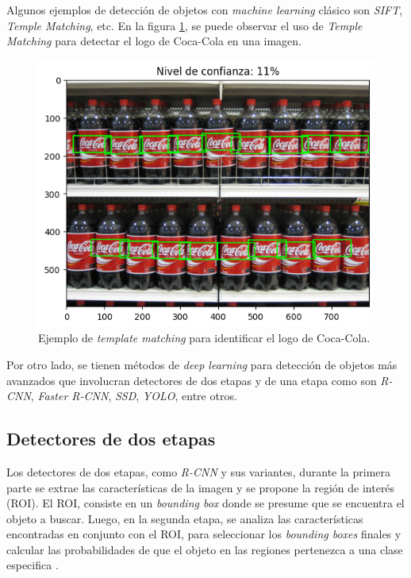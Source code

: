 Algunos ejemplos de detección de objetos con \textit{machine learning} clásico son \textit{SIFT}, \textit{Temple Matching}, etc. En la figura \ref{fig:tempMatch}, se puede observar el uso de \textit{Temple Matching} para detectar el logo de Coca-Cola en una imagen.

\begin{figure}[ht]
	\centering
	\includegraphics[scale=.45]{./Figures/template_match.png}
	\caption{Ejemplo de \textit{template matching} para identificar el logo de Coca-Cola.}
	\label{fig:tempMatch}
\end{figure}

Por otro lado, se tienen métodos de \textit{deep learning} para detección de objetos más avanzados que involucran detectores de dos etapas y de una etapa como son \textit{R-CNN}, \textit{Faster R-CNN}, \textit{SSD}, \textit{YOLO}, entre otros.

\subsection{Detectores de dos etapas}

Los detectores de dos etapas, como \textit{R-CNN} y sus variantes, durante la primera parte se extrae las características de la imagen y se propone la región de interés (ROI). El ROI, consiste en un \textit{bounding box} donde se presume que se encuentra el objeto a buscar. Luego, en la segunda etapa, se analiza las características encontradas en conjunto con el ROI, para seleccionar los \textit{bounding boxes} finales y calcular las probabilidades de que el objeto en las regiones pertenezca a una clase especifica \cite{ARTICLE:8}. 

